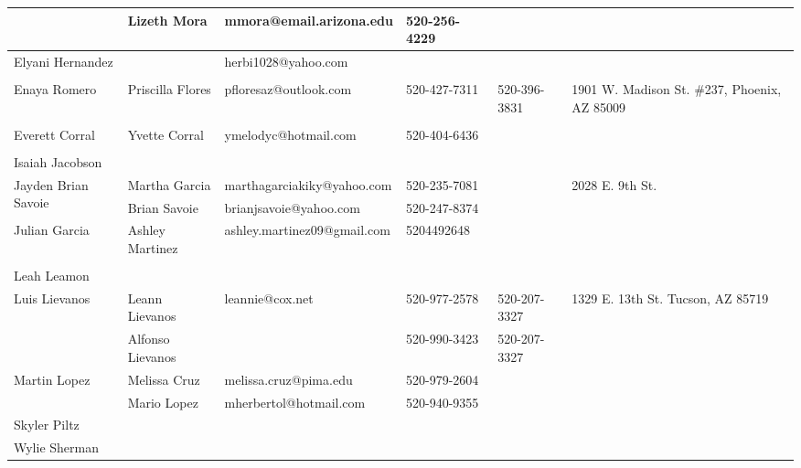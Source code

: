 \documentclass[landscape]{article}\usepackage[]{graphicx}\usepackage[]{color}
\begin{document}
\begin{longtable}{|p{100pt}|p{100pt}|p{140pt}|p{60pt}|p{64pt}|p{120pt}|}
 & Lizeth Mora & mmora@email.arizona.edu & 520-256-4229 &  & \\
\hline
\multirow{2}{100pt}{Elyani Hernandez} &  & herbi1028@yahoo.com &  &  & \multirow{2}{120pt}{} \\
 &  &  &  &  & \\
\hline
\multirow{2}{100pt}{Enaya Romero} & Priscilla Flores & pfloresaz@outlook.com & 520-427-7311 & 520-396-3831 & \multirow{2}{120pt}{1901 W. Madison St. \#237, Phoenix, AZ 85009} \\
 &  &  &  &  & \\
\hline
\multirow{2}{100pt}{Everett Corral} & Yvette Corral & ymelodyc@hotmail.com & 520-404-6436 &  & \multirow{2}{120pt}{} \\
 &  &  &  &  & \\
\hline
\multirow{2}{100pt}{Isaiah Jacobson} &  &  &  &  & \multirow{2}{120pt}{} \\
 &  &  &  &  & \\
\hline
\multirow{2}{100pt}{Jayden Brian Savoie} & Martha Garcia & marthagarciakiky@yahoo.com & 520-235-7081 &  & \multirow{2}{120pt}{2028 E. 9th St.} \\
 & Brian Savoie & brianjsavoie@yahoo.com & 520-247-8374 &  & \\
\hline
\multirow{2}{100pt}{Julian Garcia} & Ashley Martinez & ashley.martinez09@gmail.com & 5204492648 &  & \multirow{2}{120pt}{} \\
 &  &  &  &  & \\
\hline
\multirow{2}{100pt}{Leah Leamon} &  &  &  &  & \multirow{2}{120pt}{} \\
 &  &  &  &  & \\
\hline
\multirow{2}{100pt}{Luis Lievanos} & Leann Lievanos & leannie@cox.net & 520-977-2578 & 520-207-3327 & \multirow{2}{120pt}{1329 E. 13th St. Tucson, AZ 85719} \\
 & Alfonso Lievanos &  & 520-990-3423 & 520-207-3327 & \\
\hline
\multirow{2}{100pt}{Martin Lopez} & Melissa Cruz & melissa.cruz@pima.edu & 520-979-2604 &  & \multirow{2}{120pt}{} \\
 & Mario Lopez & mherbertol@hotmail.com & 520-940-9355 &  & \\
\hline
\multirow{2}{100pt}{Skyler Piltz} &  &  &  &  & \multirow{2}{120pt}{} \\
 &  &  &  &  & \\
\hline
\multirow{2}{100pt}{Wylie Sherman} &  &  &  &  & \multirow{2}{120pt}{} \\
 &  &  &  &  & \\
\hline
\end{longtable}
\newpage
\end{document}
